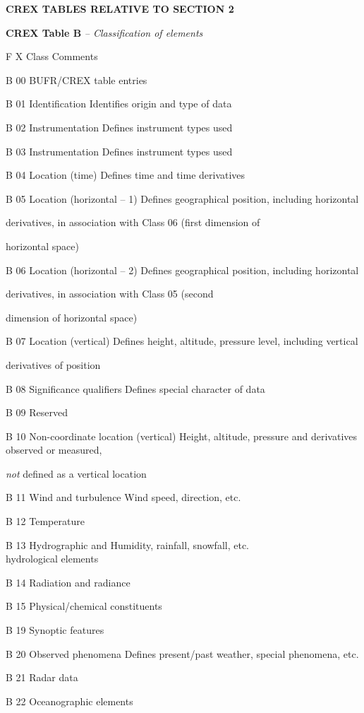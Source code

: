 \textbf{CREX TABLES RELATIVE TO SECTION 2}

\textbf{CREX Table B} \emph{-- Classification of elements}

F X Class Comments

B 00 BUFR/CREX table entries

B 01 Identification Identifies origin and type of data

B 02 Instrumentation Defines instrument types used

B 03 Instrumentation Defines instrument types used

B 04 Location (time) Defines time and time derivatives

B 05 Location (horizontal -- 1) Defines geographical position, including horizontal

derivatives, in association with Class 06 (first dimension of

horizontal space)

B 06 Location (horizontal -- 2) Defines geographical position, including horizontal

derivatives, in association with Class 05 (second

dimension of horizontal space)

B 07 Location (vertical) Defines height, altitude, pressure level, including vertical

derivatives of position

B 08 Significance qualifiers Defines special character of data

B 09 Reserved

B 10 Non-coordinate location (vertical) Height, altitude, pressure and derivatives observed or measured,

\emph{not} defined as a vertical location

B 11 Wind and turbulence Wind speed, direction, etc.

B 12 Temperature

B 13 Hydrographic and Humidity, rainfall, snowfall, etc.\\
hydrological elements

B 14 Radiation and radiance

B 15 Physical/chemical constituents

B 19 Synoptic features

B 20 Observed phenomena Defines present/past weather, special phenomena, etc.

B 21 Radar data

B 22 Oceanographic elements


